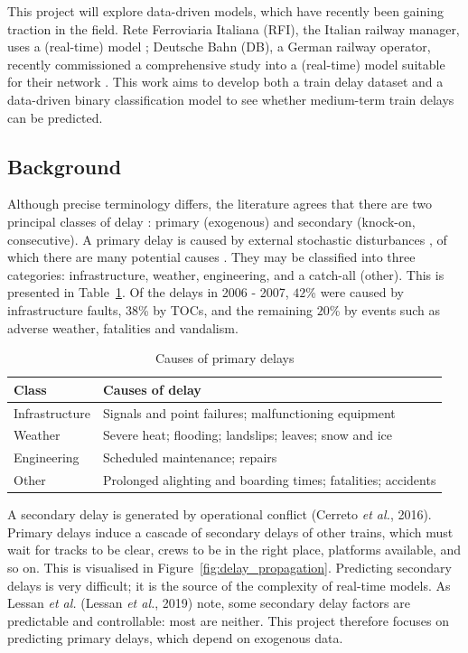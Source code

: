\documentclass[12pt,a4paper]{article}
\begin{document}
This project will explore data-driven models, which have recently been gaining traction in the field. Rete Ferroviaria Italiana (RFI), the Italian railway manager, uses a (real-time) model \cite{oneto_et_al_2016}; Deutsche Bahn (DB), a German railway operator, recently commissioned a comprehensive study into a (real-time) model suitable for their network \cite{lessan_fu_wen_2019}. This work aims to develop both a train delay dataset and a data-driven binary classification model to see whether medium-term train delays can be predicted.

\subsection{Background}
\label{subsection:background}

Although precise terminology differs, the literature agrees that there are two principal classes of delay \cite{olsson_haugland_2004}: primary (exogenous) and secondary (knock-on, consecutive). A primary delay is caused by external stochastic disturbances \cite{oneto_et_al_2016}, of which there are many potential causes \cite{berger_et_al_2011,milinkovic_et_al_2013}. They may be classified into three categories: infrastructure, weather, engineering, and a catch-all (other). This is presented in Table~\ref{table:primary_delay}. Of the delays in 2006 - 2007, $42$\% were caused by infrastructure faults, $38$\% by TOCs, and the remaining $20$\% by events such as adverse weather, fatalities and vandalism. 

\begin{table}[]
\centering
\caption{Causes of primary delays}
\label{table:primary_delay}
\begin{tabular}{|l|l|}
\hline
\textbf{Class} & \textbf{Causes of delay}                                      \\ \hline
Infrastructure & Signals and point failures; malfunctioning equipment          \\ \hline
Weather        & Severe heat; flooding; landslips; leaves; snow and ice        \\ \hline
Engineering    & Scheduled maintenance; repairs                                \\ \hline
Other          & Prolonged alighting and boarding times; fatalities; accidents \\ \hline
\end{tabular}
\end{table}

A secondary delay is generated by operational conflict (Cerreto \textit{et al.}, 2016). Primary delays induce a cascade of secondary delays of other trains, which must wait for tracks to be clear, crews to be in the right place, platforms available, and so on. This is visualised in Figure~\ref{fig:delay_propagation}. Predicting secondary delays is very difficult; it is the source of the complexity of real-time models. As Lessan \textit{et al.} (Lessan \textit{et al.}, 2019) note, some secondary delay factors are predictable and controllable: most are neither. This project therefore focuses on predicting primary delays, which depend on exogenous data. 
\end{document}
